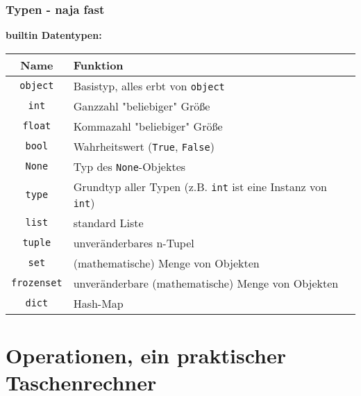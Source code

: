 \documentclass{beamer}
\begin{document}
\begin{frame}
  \frametitle{Typen - naja fast}
	\textbf{builtin Datentypen:}\\
	\begin{tabular}{c|l}
		Name & Funktion \\ \hline
		\texttt{object} & Basistyp, alles erbt von \texttt{object} \\
		\texttt{int} & Ganzzahl "beliebiger" Größe \\
		\texttt{float} & Kommazahl "beliebiger" Größe \\
		\texttt{bool} & Wahrheitswert (\texttt{True}, \texttt{False})\\
		\texttt{None} & Typ des \texttt{None}-Objektes \\
		\texttt{type} & Grundtyp aller Typen (z.B. \texttt{int} ist eine Instanz von \texttt{int}) \\
		\texttt{list} & standard Liste \\
		\texttt{tuple} & unveränderbares n-Tupel \\
		\texttt{set} & (mathematische) Menge von Objekten \\
		\texttt{frozenset} & unveränderbare (mathematische) Menge von Objekten \\
		\texttt{dict} & Hash-Map \\
	\end{tabular}
\end{frame}

\section{Operationen, ein praktischer Taschenrechner}
%
\end{document}
